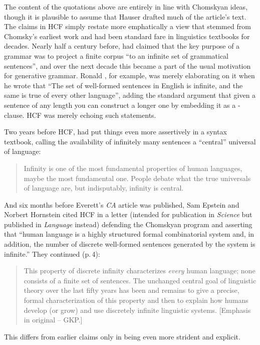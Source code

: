 \documentclass[output=paper,colorlinks,citecolor=brown
]{langscibook}
\begin{document}
The content of the quotations above are entirely in line with Chomskyan
ideas, though it is plausible to assume that Hauser drafted much of the
article's text. The claims in HCF simply restate more emphatically a
view that stemmed from Chomsky's earliest work and had been standard
fare in linguistics textbooks for decades. Nearly half a century before,
\citet[113]{Chomsky56} had claimed that the key purpose
of a grammar was to project a finite corpus ``to an infinite set of
grammatical sentences'', and over the next decade this became a part
of the usual motivation for generative grammar. Ronald \citet[31]{Langacker68}, for example, was merely elaborating on
it when he wrote that ``The set of well-formed sentences in English
is infinite, and the same is true of every other language'', adding
the standard argument that given a sentence of any length you can
construct a longer one by embedding it as a -clause.
HCF was merely echoing such statements.

Two years before HCF, \citet[3]{Lasnik00} had put things
even more assertively in a syntax textbook, calling the availability
of infinitely many sentences a ``central'' universal of language:
\begin{quote}
Infinity is one of the most fundamental properties of human languages,
maybe the most fundamental one. People debate what the true universals
of language are, but indisputably, infinity is central.
\end{quote}
And six months before Everett's \textit{CA} article was published,
Sam Epstein and Norbert Hornstein \citeyearpar{EpstHorn05} cited HCF in
a letter (intended for publication in \textit{Science} but published
in \textit{Language} instead) defending the Chomskyan program and asserting
that ``human language is a highly structured formal combinatorial system
and, in addition, the number of discrete well-formed sentences generated
by the system is infinite.'' They continued (p.\,4):

\begin{quote}\sloppy
This property of discrete infinity characterizes \mbox{\emph{every}}
human language; none consists of a finite set of sentences. The unchanged
central goal of linguistic theory over the last fifty years has been and
remains to give a precise, formal characterization of this property and
then to explain how humans develop (or grow) and use discretely infinite
linguistic systems. [Emphasis in original -- GKP.]
\end{quote}
This differs from earlier claims only in being even more strident and
explicit.
\end{document}
